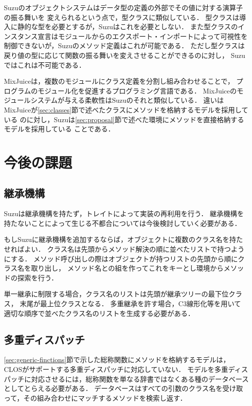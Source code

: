 \documentclass{ipsjprosym}
\begin{document}
Suzuのオブジェクトシステムはデータ型の定義の外部でその値に対する演算子の振る舞いを
変えられるという点で，型クラス\cite{Wadler:1989:MAP:75277.75283}に類似している．
型クラスは導入に静的な型を必要とするが，Suzuはこれを必要としない．
また型クラスのインスタンス宣言はモジュールからのエクスポート・インポートによって可視性を
制御できないが，Suzuのメソッド定義はこれが可能である．
ただし型クラスは戻り値の型に応じて関数の振る舞いを変えさせることができるのに対し，
Suzuではこれは不可能である．

MixJuice\cite{Ichisugi:2002}は，複数のモジュールにクラス定義を分割し組み合わせることで，
プログラムのモジュール化を促進するプログラミング言語である．
MixJuiceのモジュールシステムが与える柔軟性はSuzuのそれと類似している．
違いはMixJuiceが\ref{sec:classes}節で述べたクラスにメソッドを格納するモデルを採用している
のに対し，Suzuは\ref{sec:proposal}節で述べた環境にメソッドを直接格納するモデルを採用している
ことである．

\section{今後の課題}

\subsection{継承機構}

Suzuは継承機構を持たず，トレイトによって実装の再利用を行う．
継承機構を持たないことによって生じる不都合については今後検討していく必要がある．

もしSuzuに継承機構を追加するならば，オブジェクトに複数のクラス名を持たせればよい．
クラス名は先頭からメソッド解決の順に並べたリストで持つようにする．
メソッド呼び出しの際はオブジェクトが持つリストの先頭から順にクラス名を取り出し，
メソッド名との組を作ってこれをキーとし環境からメソッドの探索を行う．

単一継承に制限する場合，クラス名のリストは先頭が継承ツリーの最下位クラス，
末尾が最上位クラスとなる．
多重継承を許す場合，C3線形化\cite{Barrett:1996:MSL:236337.236343}等を用いて
適切な順序で並べたクラス名のリストを生成する必要がある．

\subsection{多重ディスパッチ}
\label{sec:multiple-dispatch}

\ref{sec:generic-finctions}節で示した総称関数にメソッドを格納するモデルは，
CLOSがサポートする多重ディスパッチに対応していない．
モデルを多重ディスパッチに対応させるには，総称関数を単なる辞書ではなくある種のデータベース
としてとらえる必要がある．
データベースはすべての引数のクラス名を受け取って，その組み合わせにマッチするメソッドを検索し返す．
\end{document}
